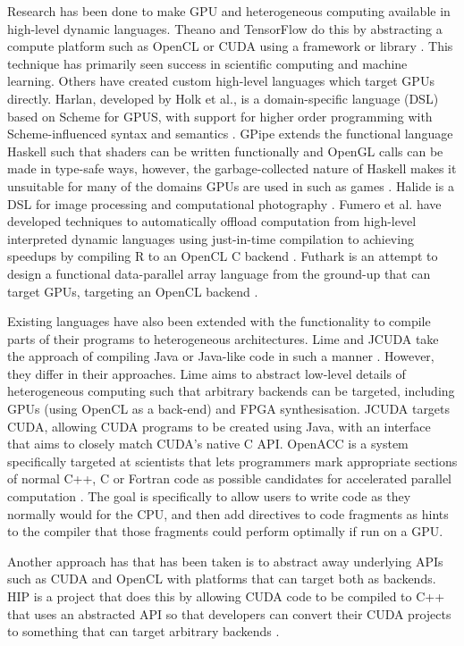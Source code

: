 \documentclass[a4paper,12pt,twoside,openright]{report}
\begin{document}
Research has been done to make GPU and heterogeneous computing available in
high-level dynamic languages. Theano and TensorFlow do this by abstracting a
compute platform such as OpenCL or CUDA using a framework or library
\cite{Theano2016} \cite{TensorFlowWhitePaper}. This technique has primarily
seen success in scientific computing and machine learning. Others have created
custom high-level languages which target GPUs directly. Harlan, developed by
Holk et al., is a domain-specific language (DSL) based on Scheme for GPUS, with
support for higher order programming with Scheme-influenced syntax and
semantics \cite{Harlan} \cite{HarlanAnnouncement}. GPipe extends the functional
language Haskell such that shaders can be written functionally and OpenGL calls
can be made in type-safe ways, however, the garbage-collected nature of Haskell
makes it unsuitable for many of the domains GPUs are used in such as games
\cite{HaskellState} \cite{GPipe}. Halide is a DSL for image processing and
computational photography \cite{Halide}. Fumero et al. have developed
techniques to automatically offload computation from high-level interpreted
dynamic languages using just-in-time compilation to achieving speedups by
compiling R to an OpenCL C backend \cite{JITGPU}. Futhark is an attempt to
design a functional data-parallel array language from the ground-up that can
target GPUs, targeting an OpenCL backend \cite{Futhark}.

Existing languages have also been extended with the functionality to compile
parts of their programs to heterogeneous architectures. Lime and JCUDA take the
approach of compiling Java or Java-like code in such a manner \cite{Lime2010}
\cite{Lime2012} \cite{JCUDA2009}. However, they differ in their approaches.
Lime aims to abstract low-level details of heterogeneous computing such that
arbitrary backends can be targeted, including GPUs (using OpenCL as a back-end)
and FPGA synthesisation. JCUDA targets CUDA, allowing CUDA programs to be
created using Java, with an interface that aims to closely match CUDA's native
C API. OpenACC is a system specifically targeted at scientists that lets
programmers mark appropriate sections of normal C++, C or Fortran code as
possible candidates for accelerated parallel computation \cite{OpenACC}. The
goal is specifically to allow users to write code as they normally would for
the CPU, and then add directives to code fragments as hints to the compiler
that those fragments could perform optimally if run on a GPU.

Another approach has that has been taken is to abstract away underlying APIs
such as CUDA and OpenCL with platforms that can target both as backends. HIP is
a project that does this by allowing CUDA code to be compiled to C++ that uses
an abstracted API so that developers can convert their CUDA projects to
something that can target arbitrary backends \cite{HIP}.
\end{document}
